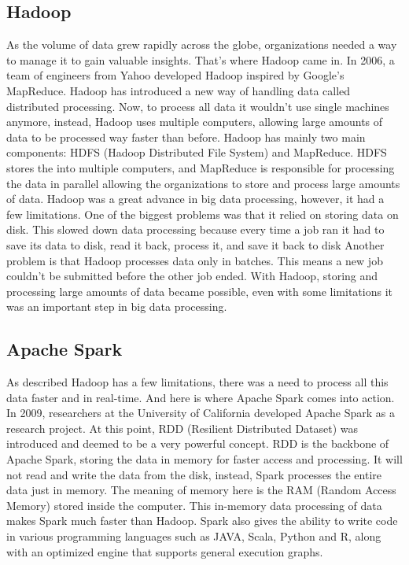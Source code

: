 \subsection{Hadoop}
As the volume of data grew rapidly across the globe, organizations needed a way to manage it to gain valuable insights. That’s where Hadoop came in. In 2006, a team of engineers from Yahoo developed Hadoop inspired by Google’s MapReduce. Hadoop has introduced a new way of handling data called distributed processing. Now, to process all data it wouldn't use single machines anymore, instead, Hadoop uses multiple computers, allowing large amounts of data to be processed way faster than before.
Hadoop has mainly two main components: HDFS (Hadoop Distributed File System) and MapReduce. HDFS stores the into multiple computers, and MapReduce is responsible for processing the data in parallel allowing the organizations to store and process large amounts of data.
Hadoop was a great advance in big data processing, however, it had a few limitations. One of the biggest problems was that it relied on storing data on disk. This slowed down data processing because every time a job ran it had to save its data to disk, read it back, process it, and save it back to disk Another problem is that Hadoop processes data only in batches. This means a new job couldn't be submitted before the other job ended.
With Hadoop, storing and processing large amounts of data became possible, even with some limitations it was an important step in big data processing.\cite{hadoop}


\subsection{Apache Spark}
As described Hadoop has a few limitations, there was a need to process all this data faster and in real-time. And here is where Apache Spark comes into action. In 2009, researchers at the University of California developed Apache Spark as a research project. At this point, RDD (Resilient Distributed Dataset) was introduced and deemed to be a very powerful concept.\cite{apache-spark}
RDD is the backbone of Apache Spark, storing the data in memory for faster access and processing. It will not read and write the data from the disk, instead, Spark processes the entire data just in memory. The meaning of memory here is the RAM (Random Access Memory) stored inside the computer. This in-memory data processing of data makes Spark much faster than Hadoop. 
Spark also gives the ability to write code in various programming languages such as JAVA, Scala, Python and R, along with an optimized engine that supports general execution graphs.

